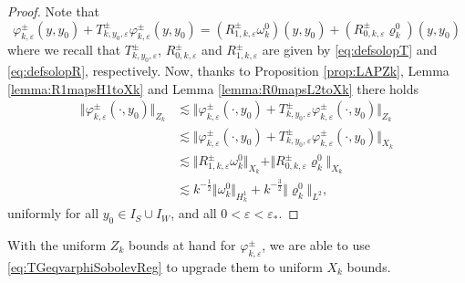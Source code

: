 \documentclass[11pt,reqno]{amsproc}
\theoremstyle{definition}
\numberwithin{equation}{section}
\newcommand{\ep}{\varepsilon}
\begin{document}
\begin{proof}
Note that
\begin{equation}\label{eq:resolventvarphi}
\varphi_{k,\ep}^\pm(y,y_0) + T_{k,y_0,\ep}^\pm \varphi_{k,\ep}^\pm (y,y_0) = \left(R_{1,k,\ep}^\pm\omega_k^0\right)(y,y_0) + \left( R_{0,k,\ep}^\pm \varrho_k^0 \right) (y,y_0)
\end{equation}
where we recall that $T_{k,y_0,\ep}^\pm$, $R_{0,k,\ep}^\pm$ and $R_{1,k,\ep}^\pm$ are given by \eqref{eq:defsolopT} and \eqref{eq:defsolopR}, respectively. Now, thanks to Proposition \ref{prop:LAPZk},  Lemma \ref{lemma:R1mapsH1toXk} and Lemma \ref{lemma:R0mapsL2toXk} there holds
\begin{align*}
\Vert \varphi_{k,\ep}^\pm(\cdot,y_0) \Vert_{Z_k} &\lesssim \Vert \varphi_{k,\ep}^\pm(\cdot,y_0) + T_{k,y_0,\ep}^\pm \varphi_{k,\ep}^\pm (\cdot,y_0) \Vert_{Z_k}  \\
&\lesssim \Vert \varphi_{k,\ep}^\pm(\cdot,y_0) + T_{k,y_0,\ep}^\pm \varphi_{k,\ep}^\pm (\cdot,y_0) \Vert_{X_k}  \\
&\lesssim \Vert R_{1,k,\ep}^\pm\omega_k^0\Vert_{X_k} + \Vert R_{0,k,\ep}^\pm  \varrho_k^0 \Vert_{X_k} \\
&\lesssim k^{-\frac12}\Vert \omega_k^0 \Vert_{H^1_k} + k^{-\frac32}\Vert  \varrho_k^0\Vert_{L^2},
\end{align*}
uniformly for all $y_0\in I_S\cup I_W$, and all $0< \ep< \ep_*$. 
\end{proof}

With the uniform $Z_k$ bounds at hand for $\varphi_{k,\ep}^\pm$, we are able to use \eqref{eq:TGeqvarphiSobolevReg} to upgrade them to uniform $X_k$ bounds.
\end{document}
